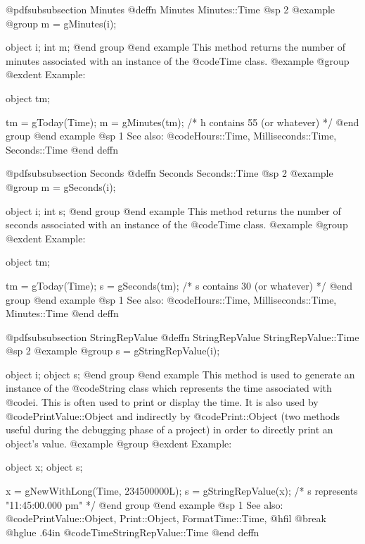 @pdfsubsubsection {Minutes}
@deffn {Minutes} Minutes::Time
@sp 2
@example
@group
m = gMinutes(i);

object  i;
int     m;
@end group
@end example
This method returns the number of minutes associated with an
instance of the @code{Time} class.
@example
@group
@exdent Example:

object  tm;

tm = gToday(Time);
m = gMinutes(tm);   /*  h contains 55 (or whatever)  */
@end group
@end example
@sp 1
See also:  @code{Hours::Time, Milliseconds::Time, Seconds::Time}
@end deffn
















@pdfsubsubsection {Seconds}
@deffn {Seconds} Seconds::Time
@sp 2
@example
@group
m = gSeconds(i);

object  i;
int     s;
@end group
@end example
This method returns the number of seconds associated with an
instance of the @code{Time} class.
@example
@group
@exdent Example:

object  tm;

tm = gToday(Time);
s = gSeconds(tm);   /*  s contains 30 (or whatever)  */
@end group
@end example
@sp 1
See also:  @code{Hours::Time, Milliseconds::Time, Minutes::Time}
@end deffn
















@pdfsubsubsection {StringRepValue}
@deffn {StringRepValue} StringRepValue::Time
@sp 2
@example
@group
s = gStringRepValue(i);

object  i;
object  s;
@end group
@end example
This method is used to generate an instance of the @code{String} class
which represents the time associated with @code{i}.  This is often
used to print or display the time.  It is also used by
@code{PrintValue::Object} and indirectly by @code{Print::Object}
(two methods useful during the debugging phase of a project)
in order to directly print an object's value.
@example
@group
@exdent Example:

object  x;
object  s;

x = gNewWithLong(Time, 234500000L);
s = gStringRepValue(x);
   /*  s represents "11:45:00.000 pm"  */
@end group
@end example
@sp 1
See also:  @code{PrintValue::Object, Print::Object, FormatTime::Time,}
@hfil @break @hglue .64in      @code{TimeStringRepValue::Time}
@end deffn











